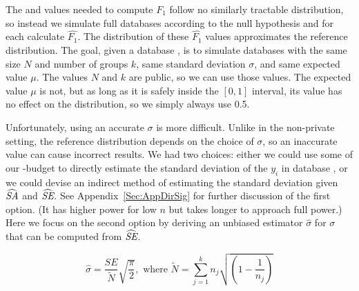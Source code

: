 The \sa and \se values needed to compute $F_1$ follow no similarly tractable distribution, so instead we simulate full databases according to the null hypothesis and for each calculate $\widehat{F_1}$.  The distribution of these $\widehat{F_1}$ values approximates the reference distribution.  The goal, given a database \x, is to simulate databases with the same size $N$ and number of groups $k$, same standard deviation $\sigma$, and same expected value $\mu$.  The values $N$ and $k$ are public, so we can use those values.  The expected value $\mu$ is not, but as long as it is safely inside the $[0,1]$ interval, its value has no effect on the distribution, so we simply always use 0.5. 




Unfortunately, using an accurate $\sigma$ is more difficult.  Unlike in the non-private setting, the reference distribution depends on the choice of $\sigma$, so an inaccurate value can cause incorrect results.  We had two choices: either we could use some of our \eps-budget to directly estimate the standard deviation of the $y_i$ in database \x, or we could devise an indirect method of estimating the standard deviation given $\widehat{\textit{SA}}$ and $\widehat{\textit{SE}}$. See Appendix~\ref{Sec:AppDirSig} for further discussion of the first option.  (It has higher power for low $n$ but takes longer to approach full power.)  Here we focus on the second option by deriving an unbiased estimator $\hat{\sigma}$ for $\sigma$ that can be computed from $\widehat{\textit{SE}}$.

$$
\hat{\sigma} = \frac{\widehat{SE}}{\tilde{N}}\sqrt{\frac{\pi}{2}}, \text{ where } \tilde{N} = \sum_{j=1}^k n_j \sqrt{\left(1 - \frac{1}{n_j}\right)}
$$

